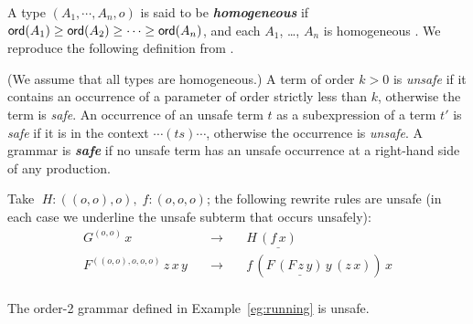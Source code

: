 \documentclass{llncs}
\newcommand\defname[1]{{\bf\em #1}\index{#1}}
\newcommand\ord[1]{{\sf
    ord}(#1)} \newcommand\typear{\rightarrow}
\begin{document}
A type $(A_1, \cdots, A_n, o)$ is said to be \defname{homogeneous} if
$\ord{A_1} \geq \ord{A_2}\geq \cdots \geq \ord{A_n}$, and each $A_1$,
\ldots, $A_n$ is homogeneous \cite{KNU02}.  We reproduce the following
definition from \cite{KNU02}.

\begin{definition}\rm
  (We assume that all types are homogeneous.) A term of order $k > 0$
  is \emph{unsafe} if it contains an occurrence of a parameter of
  order strictly less than $k$, otherwise the term is \emph{safe}. An
  occurrence of an unsafe term $t$ as a subexpression of a term $t'$
  is \emph{safe} if it is in the context $\cdots (ts) \cdots$,
  otherwise the occurrence is \emph{unsafe}. A grammar is
  \defname{safe} if no unsafe term has an unsafe occurrence at a
  right-hand side of any production.
\end{definition}

\begin{example}\begin{inparaenum}[(i)] \item Take $\; H : ((o, o), o), \; f : (o, o, o)$; the
    following rewrite rules are unsafe (in each case we underline the
    unsafe subterm that occurs unsafely):
\[\begin{array}{rll}
G^{(o, o)} \, x & \quad \rightarrow \quad & H \, \underline{(f \, {x})} \\
F^{((o, o), o, o, o)} \, z \, x \, y & \quad \rightarrow \quad & f \, (F \, \underline{(F \, z
\, {y})} \, y \, (z \, x) ) \, x \\
\end{array}\]
\item The order-2 grammar defined in Example~\ref{eg:running} is
  unsafe.
\end{inparaenum}
\end{example}
\end{document}
